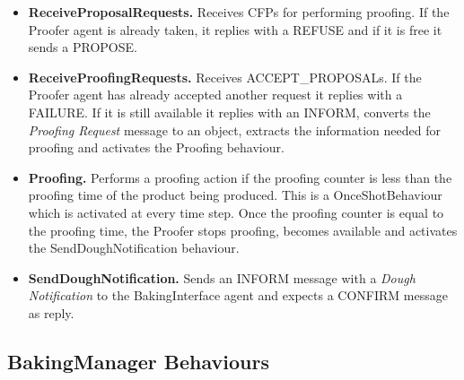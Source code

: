 \documentclass[paper=a4, fontsize=11pt]{scrartcl}
\begin{document}
		\begin{itemize}
			\item \textbf{ReceiveProposalRequests.} Receives CFPs for performing proofing. If the Proofer agent is already taken, it replies with a REFUSE and if it is free it sends a PROPOSE.

			\item \textbf{ReceiveProofingRequests.} Receives ACCEPT\_PROPOSALs.  If the Proofer agent has already accepted another request it replies with a FAILURE. If it is still available it replies with an INFORM, converts the \textit{Proofing Request} message to an object, extracts the information needed for proofing and activates the Proofing behaviour.

			\item \textbf{Proofing.} Performs a proofing action if the proofing counter is less than the proofing time of the product being produced. This is a OnceShotBehaviour which is activated at every time step. Once the proofing counter is equal to the proofing time, the Proofer stops proofing, becomes available and activates the SendDoughNotification behaviour.

			\item \textbf{SendDoughNotification.} Sends an INFORM message with a \textit{Dough Notification} to the BakingInterface agent and expects a CONFIRM message as reply.
		\end{itemize}

	\subsection*{BakingManager Behaviours}
\end{document}
